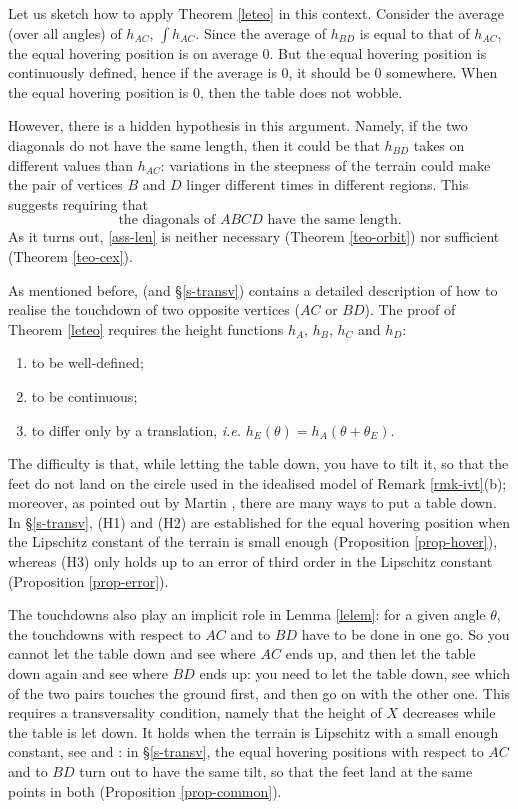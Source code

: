 \documentclass[a4paper,11pt,twoside,leqno]{article}
\numberwithin{equation}{section}
\begin{document}
Let us sketch how to apply Theorem \ref{leteo} in this context. 
Consider the average (over all angles) of $h_{AC}$, $\int h_{AC}$.
Since the average of $h_{BD}$ is equal to that of $h_{AC}$, the equal hovering position is on average 0.
But the equal hovering position is continuously defined, hence if the average is $0$, it should be 0 somewhere.
When the equal hovering position is 0, then the table does not wobble. 

However, there is a hidden hypothesis in this argument. Namely, if the two diagonals do not have the same length, then it could be that $h_{BD}$ takes on different values than $h_{AC}$: variations in the steepness of the terrain could make the pair of vertices $B$ and $D$ linger different times in different regions. This suggests requiring that
\begin{equation}\label{ass-len}
\text{the diagonals of } ABCD \text{ have the same length.}
\end{equation}
As it turns out, \eqref{ass-len} is neither necessary (Theorem \ref{teo-orbit}) nor sufficient (Theorem \ref{teo-cex}).

As mentioned before, \cite{BLPR} (and \S{}\ref{s-transv}) contains a detailed description of how to realise the touchdown of two opposite vertices ($AC$ or $BD$).
The proof of Theorem \ref{leteo} requires the height functions $h_A$, $h_B$, $h_C$ and $h_D$:
\begin{enumerate}\renewcommand{\theenumi}{\bfseries (H\arabic{enumi})}
 \item to be well-defined;
 \item to be continuous;
 \item to differ only by a translation, \emph{i.e.} $h_E(\theta) = h_A(\theta + \theta_E)$.
\end{enumerate}
The difficulty is that, while letting the table down, you have to tilt it, so that the feet do not land on the circle used in the idealised model of Remark \ref{rmk-ivt}(b); moreover, as pointed out by Martin \cite{Mar}, there are many ways to put a table down. In \S{}\ref{s-transv}, (H1) and (H2) are established for the equal hovering position when the Lipschitz constant of the terrain is small enough (Proposition \ref{prop-hover}), whereas (H3) only holds up to an error of third order in the Lipschitz constant (Proposition \ref{prop-error}).

The touchdowns also play an implicit role in Lemma \ref{lelem}: for a given angle $\theta$, the touchdowns with respect to $AC$ and to $BD$ have to be done in one go. So you cannot let the table down and see where $AC$ ends up, and then let the table down again and see where $BD$ ends up: you need to let the table down, see which of the two pairs touches the ground first, and then go on with the other one. This requires a transversality condition, namely that the height of $X$ decreases while the table is let down. It holds when the terrain is Lipschitz with a small enough constant, see \cite{BLPR} and \cite{Mar}: in \S{}\ref{s-transv}, the equal hovering positions with respect to $AC$ and to $BD$ turn out to have the same tilt, so that the feet land at the same points in both (Proposition \ref{prop-common}).
\end{document}
